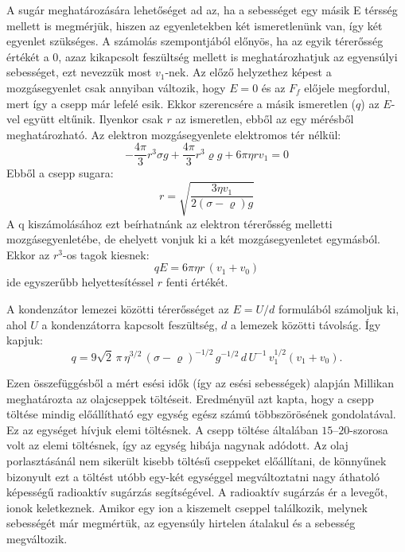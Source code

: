 \documentclass[../main.tex]{subfiles}
\begin{document}
A sugár meghatározására lehetőséget ad az, ha a sebességet egy másik
E térsség mellett is megmérjük, hiszen az egyenletekben két ismeretlenünk
van, így két egyenlet szükséges.
A számolás szempontjából előnyös, ha az egyik térerősség értékét a 0,
azaz kikapcsolt feszültség mellett is meghatározhatjuk az egyensúlyi
sebességet, ezt nevezzük most $v_1$-nek.
Az előző helyzethez képest a mozgásegyenlet csak annyiban változik,
hogy $E = 0$ és az $F_f$ előjele megfordul, mert így a csepp már lefelé esik.
Ekkor szerencsére a másik ismeretlen ($q$) az $E$-vel együtt eltűnik.
Ilyenkor csak $r$ az ismeretlen, ebből az egy mérésből meghatározható.
Az elektron mozgásegyenlete elektromos tér nélkül:
\begin{equation}
-\frac{4\pi}{3}r^3\sigma g + \frac{4\pi}{3}r^3\varrho g + 6\pi\eta r v_1 = 0
\end{equation}
Ebből a csepp sugara:
\begin{equation}
r = \sqrt{\frac{3\eta v_1}{2(\sigma-\varrho)g}}
\end{equation}
A q kiszámolásához ezt beírhatnánk az elektron térerősség melletti
mozgásegyenletébe, de ehelyett vonjuk ki a két mozgásegyenletet
egymásból.
Ekkor az $r^3$-os tagok kiesnek:
\begin{equation}
qE = 6\pi\eta r\,(v_1+v_0)
\end{equation}
ide egyszerűbb helyettesítéssel $r$ fenti értékét.

A kondenzátor lemezei közötti térerősséget az $E=U/d$ formulából
számoljuk ki, ahol $U$ a kondenzátorra kapcsolt feszültség, $d$ a lemezek
közötti távolság.
Így kapjuk:
\begin{equation}
q = 9\sqrt{2}\,\pi\,\eta^{3/2}\,(\sigma-\varrho)^{-1/2}\,g^{-1/2}\,
d\,U^{-1}\,v_1^{1/2}(v_1+v_0).
\end{equation}

Ezen összefüggésből a mért esési idők (így az esési sebességek)
alapján Millikan meghatározta az olajcseppek töltéseit.
Eredményül azt kapta, hogy a csepp töltése mindig előállítható egy
egység egész számú többszörösének gondolatával.
Ez az egységet hívjuk elemi töltésnek.
A csepp töltése általában $15$--$20$-szorosa volt az elemi töltésnek,
így az egység hibája nagynak adódott.
Az olaj porlasztásánál nem sikerült kisebb töltésű cseppeket előállítani,
de könnyűnek bizonyult ezt a töltést utóbb egy-két egységgel
megváltoztatni nagy áthatoló képességű radioaktív sugárzás segítségével.
A radioaktív sugárzás ér a levegőt, ionok keletkeznek.
Amikor egy ion a kiszemelt cseppel találkozik, melynek sebességét már
megmértük, az egyensúly hirtelen átalakul és a sebesség megváltozik.
\end{document}

